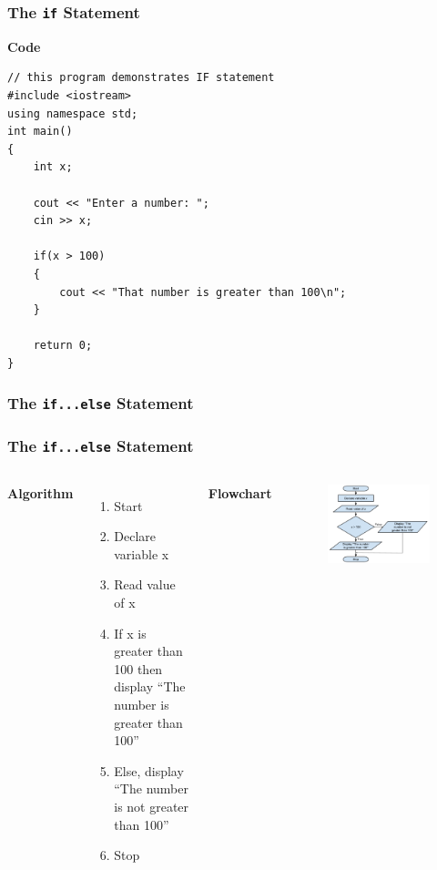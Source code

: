 \documentclass{beamer}
\begin{document}
\begin{frame}[fragile]
    \frametitle{The \texttt{if} Statement}
    \textbf{Code}
    \lstset{style=mystyle}
    \begin{lstlisting}
// this program demonstrates IF statement
#include <iostream>
using namespace std;
int main()
{
    int x;

    cout << "Enter a number: ";
    cin >> x;

    if(x > 100)
    {
        cout << "That number is greater than 100\n";
    }

    return 0;
}\end{lstlisting}

\end{frame}

\begin{frame}[fragile]
    \frametitle{The \texttt{if...else} Statement}
    \subsubsection{The \texttt{if...else} Statement} %
    \label{ssub:the_if_else}
    \begin{columns}
    \textbf{Algorithm}
    \begin{enumerate}
        \item Start
        \item Declare variable x
        \item Read value of x
        \item If x is greater than 100 then display ``The number is greater than 100''
        \item Else, display ``The number is not greater than 100''
        \item Stop
    \end{enumerate}
    \textbf{Flowchart}
    \begin{figure}
        \centering
        \includegraphics[scale=0.4]{flowchart2}
    \end{figure}
    \end{columns}
\end{frame}
\end{document}
